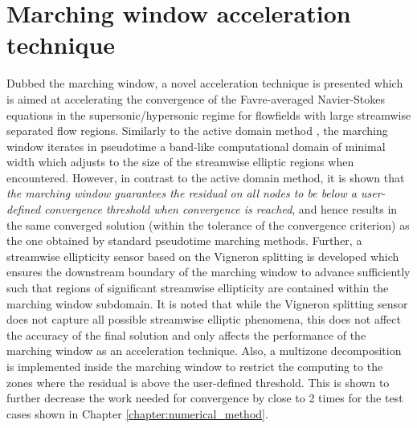 \section{Marching window acceleration technique}

Dubbed the marching window, a novel acceleration technique is presented which
is aimed at accelerating the convergence of the Favre-averaged Navier-Stokes
equations in the supersonic/hypersonic regime for flowfields with large streamwise
separated flow regions. Similarly to the active domain method \cite{aiaa:1997:nakahashi},
the marching window iterates in pseudotime a band-like computational domain of minimal
width which adjusts to the size of the streamwise elliptic regions when encountered.
However, in contrast to the active domain method, it is shown that \emph{the marching window
guarantees the residual on all nodes to be below a user-defined convergence
threshold when convergence
is reached}, and hence results in the same
converged solution (within the tolerance of the convergence criterion) as the
one obtained by standard pseudotime marching methods. Further,
a streamwise ellipticity sensor based on the Vigneron splitting
\cite{aiaaconf:1978:vigneron} is developed which ensures
the downstream boundary of the marching window to advance sufficiently
such that regions of significant streamwise
ellipticity are contained within the marching window subdomain.
It is noted that while the Vigneron splitting sensor does not capture all possible
streamwise elliptic phenomena, this does not affect the accuracy of the final solution
and only affects the performance of the marching window as an acceleration
technique. Also, a multizone decomposition is implemented inside the marching window
to restrict the computing to the zones where the residual is above the user-defined
threshold. This is shown to further decrease the work needed for convergence by close to
2 times for the test cases shown in Chapter \ref{chapter:numerical_method}.


